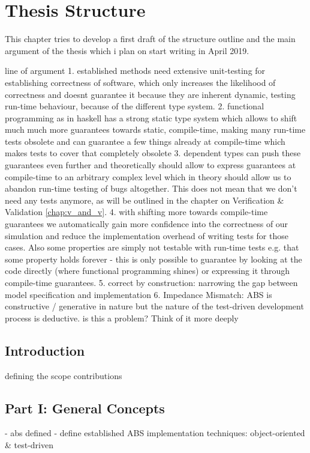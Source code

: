 \chapter{Thesis Structure}
\label{app:thesis_struct}

This chapter tries to develop a first draft of the structure outline and the main argument of the thesis which i plan on start writing in April 2019.

line of argument
1. established methods need extensive unit-testing for establishing correctness of software, which only increases the likelihood of correctness and doesnt guarantee it because they are inherent dynamic, testing run-time behaviour, because of the different type system.
2. functional programming as in haskell has a strong static type system which allows to shift much much more guarantees towards static, compile-time, making many run-time tests obsolete and can guarantee a few things already at compile-time which makes tests to cover that completely obsolete
3. dependent types can push these guarantees even further and theoretically should allow to express guarantees at compile-time to an arbitrary complex level which in theory should allow us to abandon run-time testing of bugs altogether. This does not mean that we don't need any tests anymore, as will be outlined in the chapter on Verification \& Validation \ref{chap:v_and_v}.
4. with shifting more towards compile-time guarantees we automatically gain more confidence into the correctness of our simulation and reduce the implementation overhead of writing tests for those cases. Also some properties are simply not testable with run-time tests e.g. that some property holds forever - this is only possible to guarantee by looking at the code directly (where functional programming shines) or expressing it through compile-time guarantees. 
5. correct by construction: narrowing the gap between model specification and implementation 
6. Impedance Mismatch: ABS is constructive / generative in nature but the nature of the test-driven development process is deductive. is this a problem? Think of it more deeply

\section{Introduction}
defining the scope
contributions

\section{Part I: General Concepts}
- abs defined
- define established ABS implementation techniques: object-oriented \& test-driven

